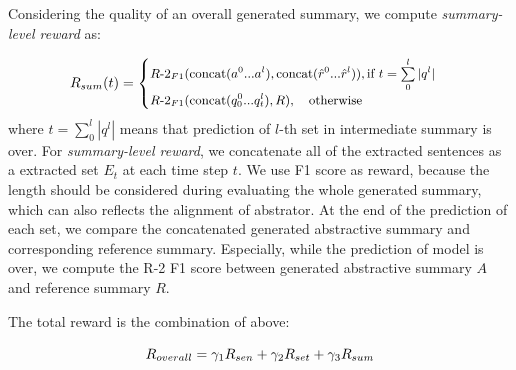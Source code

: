Considering the quality of an overall generated summary,
we compute {\em summary-level reward} as:

\begin{equation}
\small
R_{sum}(t) = 
	\begin{cases}
		   \mbox{$R$-$2_{F1}(\mbox{concat}(a^0...a^l), \mbox{concat}(\hat{r}^0...\hat{r}^l))$}, \mbox{if $t=\sum\limits_{0}^{l}|q^l|$}&\\
           \mbox{$R$-}2_{F1}(\mbox{concat}(q_0^0...q_t^l), R), \quad \mbox{otherwise}&\\
   \end{cases}
\end{equation}
where $t=\sum\limits_{0}^{l}|q^l|$ means that prediction of $l$-th set in 
intermediate summary is over.
For {\em summary-level reward}, we concatenate all of the extracted sentences as a extracted set $E_t$ at each time step $t$.
We use F1 score as reward, because the length should be considered during evaluating the whole generated summary,
which can also reflects the alignment of abstrator.
At the end of the prediction of each set, we compare the concatenated generated abstractive summary and corresponding
reference summary. 
Especially, while the prediction of model is over, we compute the R-2 F1 score between generated abstractive summary $A$ and reference summary $R$.

The total reward is the combination of above:

\begin{equation}
\label{func:reward}
\small
R_{overall} = \gamma_{1}R_{sen} + \gamma_{2}R_{set} + \gamma_{3}R_{sum}
\end{equation}



